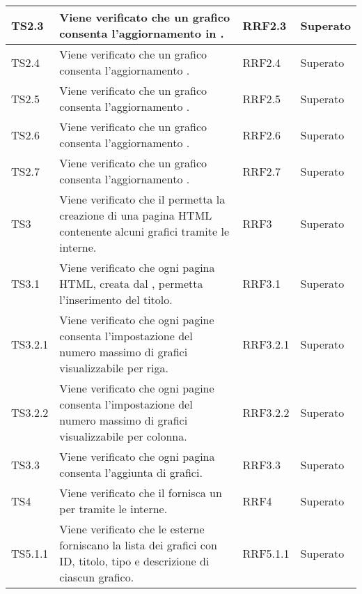 \begin{longtabu}{| X[0.5] | X | X[0.5] | X[0.4] |}
TS2.3 & Viene verificato che un grafico  consenta l'aggiornamento in . & RRF2.3 & Superato\\ \hline

TS2.4 & Viene verificato che un grafico  consenta l'aggiornamento . & RRF2.4 & Superato\\ \hline

TS2.5 & Viene verificato che un grafico  consenta l'aggiornamento . & RRF2.5 & Superato\\ \hline

TS2.6 & Viene verificato che un grafico  consenta l'aggiornamento . & RRF2.6 & Superato\\ \hline

TS2.7 & Viene verificato che un grafico  consenta l'aggiornamento . & RRF2.7 & Superato\\ \hline

TS3 & Viene verificato che il  permetta la creazione di una pagina HTML contenente alcuni grafici tramite le  interne. & RRF3 & Superato\\ \hline

TS3.1 & Viene verificato che ogni pagina HTML, creata dal , permetta l'inserimento del titolo. & RRF3.1 & Superato\\ \hline

TS3.2.1 & Viene verificato che ogni pagine consenta l'impostazione del numero massimo di grafici visualizzabile per riga. & RRF3.2.1 & Superato\\ \hline

TS3.2.2 & Viene verificato che ogni pagine consenta l'impostazione del numero massimo di grafici visualizzabile per colonna. & RRF3.2.2 & Superato\\ \hline

TS3.3 & Viene verificato che ogni pagina consenta l'aggiunta di grafici. & RRF3.3 & Superato\\ \hline

TS4 & Viene verificato che il  fornisca un  per  tramite le  interne. & RRF4 & Superato\\ \hline

TS5.1.1 & Viene verificato che le  esterne forniscano la lista dei grafici con ID, titolo, tipo e descrizione di ciascun grafico. & RRF5.1.1 & Superato\\ \hline


\end{longtabu}
